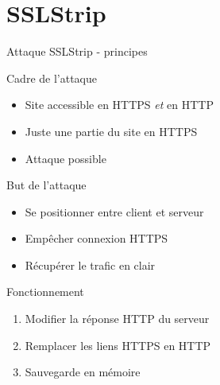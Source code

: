\section{SSLStrip}



\begin{frame}[fragile]{Attaque SSLStrip - principes}
      \begin{alertblock}{Cadre de l'attaque}
        \begin{itemize}
        \item Site accessible en HTTPS \emph{et} en HTTP
        \item Juste une partie du site en HTTPS
        \item Attaque possible
        \end{itemize}
      \end{alertblock}
      \begin{block}{But de l'attaque}
        \begin{itemize}
        \item Se positionner entre client et serveur
        \item Empêcher connexion HTTPS
        \item Récupérer le trafic en clair
        \end{itemize}
      \end{block}
      \begin{block}{Fonctionnement}
        \begin{enumerate}
        \item Modifier la réponse HTTP du serveur
        \item Remplacer les liens HTTPS en HTTP
        \item Sauvegarde en mémoire
        \end{enumerate}
      \end{block}
\end{frame}


